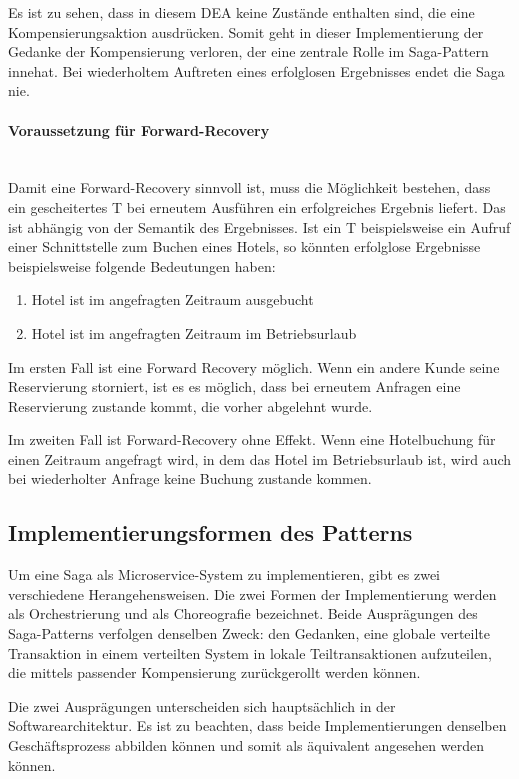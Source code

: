 Es ist zu sehen, dass in diesem DEA keine Zustände enthalten sind, die eine Kompensierungsaktion ausdrücken. Somit geht in dieser Implementierung der Gedanke der Kompensierung verloren, der eine zentrale Rolle im Saga-Pattern innehat. Bei wiederholtem Auftreten eines erfolglosen Ergebnisses endet die Saga nie. 

\paragraph*{Voraussetzung für Forward-Recovery} \mbox{}\\
Damit eine Forward-Recovery sinnvoll ist, muss die Möglichkeit bestehen, dass ein gescheitertes T bei erneutem Ausführen ein erfolgreiches Ergebnis liefert. Das ist abhängig von der Semantik des Ergebnisses. Ist ein T beispielsweise ein Aufruf einer Schnittstelle zum Buchen eines Hotels, so könnten erfolglose Ergebnisse beispielsweise folgende Bedeutungen haben:
\begin{enumerate}
	\item Hotel ist im angefragten Zeitraum ausgebucht
	\item Hotel ist im angefragten Zeitraum im Betriebsurlaub 
\end{enumerate}

Im ersten Fall ist eine Forward Recovery möglich. Wenn ein andere Kunde seine Reservierung storniert, ist es es möglich, dass bei erneutem Anfragen eine Reservierung zustande kommt, die vorher abgelehnt wurde.

Im zweiten Fall ist Forward-Recovery ohne Effekt. Wenn eine Hotelbuchung für einen Zeitraum angefragt wird, in dem das Hotel im Betriebsurlaub ist, wird auch bei wiederholter Anfrage keine Buchung zustande kommen.

\subsection{Implementierungsformen des Patterns}\label{subs_Saga_Implementierungsformen}
Um eine Saga als Microservice-System zu implementieren, gibt es zwei verschiedene Herangehensweisen. Die zwei Formen der Implementierung werden als Orchestrierung und als Choreografie bezeichnet. Beide Ausprägungen des Saga-Patterns verfolgen denselben Zweck: den Gedanken, eine globale verteilte Transaktion in einem verteilten System in lokale Teiltransaktionen aufzuteilen, die mittels passender Kompensierung zurückgerollt werden können. 

Die zwei Ausprägungen unterscheiden sich hauptsächlich in der Softwarearchitektur. Es ist zu beachten, dass beide Implementierungen denselben Geschäftsprozess abbilden können und somit als äquivalent angesehen werden können. %

